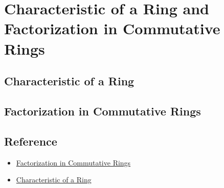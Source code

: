 \chapter{Characteristic of a Ring and Factorization in Commutative Rings}\label{chp:4_5}

\section{Characteristic of a Ring}

\section{Factorization in Commutative Rings}




\section{Reference}
\begin{itemize}
    \item \href{https://faculty.etsu.edu/gardnerr/5410/notes/III-3.pdf}{Factorization in Commutative Rings}
    \item \href{https://acikders.ankara.edu.tr/pluginfile.php/160709/mod_resource/content/0/3.%20Characteristic%20of%20a%20Ring.pdf}{Characteristic of a Ring}
\end{itemize}